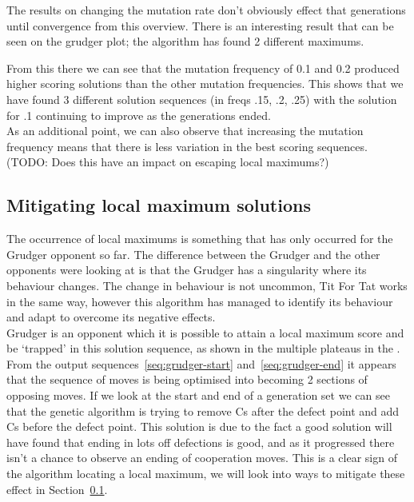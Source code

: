 
The results on changing the mutation rate don't obviously effect that generations until convergence from this overview. There is an interesting result that can be seen on the grudger plot; the algorithm has found 2 different maximums.   


From this there we can see that the mutation frequency of 0.1 and 0.2 produced higher scoring solutions than the other mutation frequencies. This shows that we have found 3 different solution sequences (in freqs .15, .2, .25) with the solution for .1 continuing to improve as the generations ended.\\
            
As an additional point, we can also observe that increasing the mutation frequency means that there is less variation in the best scoring sequences. (TODO: Does this have an impact on escaping local maximums?)

\subsection{Mitigating local maximum solutions}\label{sec:mitigating local maximums}
The occurrence of local maximums is something that has only occurred for the Grudger opponent so far. The difference between the Grudger and the other opponents were looking at is that the Grudger has a singularity where its behaviour changes. The change in behaviour is not uncommon, Tit For Tat works in the same way, however this algorithm has managed to identify its behaviour and adapt to overcome its negative effects.\\
            
Grudger is an opponent which it is possible to attain a local maximum score and be `trapped' in this solution sequence, as shown in the multiple plateaus in the .
From the output sequences~\ref{seq:grudger-start} and~\ref{seq:grudger-end} it appears that the sequence of moves is being optimised into becoming 2 sections of opposing moves. 
If we look at the start and end of a generation set we can see that the genetic algorithm is trying to remove Cs after the defect point and add Cs before the defect point. 
This solution is due to the fact a good solution will have found that ending in lots off defections is good, and as it progressed there isn't a chance to observe an ending of cooperation moves. 
This is a clear sign of the algorithm locating a local maximum, we will look into ways to mitigate these effect in Section~\ref{sec:mitigating local maximums}.\\

